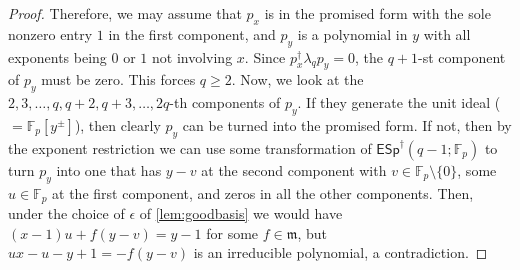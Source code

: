\documentclass[aps,pra,
floatfix,notitlepage,
nofootinbib,
longbibliography,11pt]{revtex4-1}
\theoremstyle{definition}
\newcommand{\FF}{{\mathbb{F}}}
\newcommand{\mm}{\mathfrak{m}}
\newcommand{\ESp}{{\mathsf{ESp}^\dagger}}
\begin{document}
\begin{proof}
Therefore, we may assume that $p_x$ is in the promised form 
with the sole nonzero entry $1$ in the first component,
and $p_y$ is a polynomial in $y$ with all exponents being $0$ or $1$ not involving $x$.
Since $p_x^\dagger \lambda_q p_y = 0$, the $q+1$-st component of $p_y$ must be zero.
This forces $q \ge 2$.
Now, we look at the $2,3,\ldots,q,q+2,q+3,\ldots,2q$-th components of $p_y$.
If they generate the unit ideal ($=\FF_p[y^\pm]$),
then clearly $p_y$ can be turned into the promised form.
If not, then by the exponent restriction we can use some transformation of $\ESp(q-1;\FF_p)$
to turn $p_y$ into one that has $y-v$ at the second component with $v \in \FF_p\setminus\{0\}$,
some $u \in \FF_p$ at the first component,
and zeros in all the other components.
Then, under the choice of $\epsilon$ of \cref{lem:goodbasis}
we would have $(x-1)u + f (y-v) = y-1$ for some $f \in \mm$,
but $ux - u - y+1 = -f(y-v)$ is an irreducible polynomial,
a contradiction.
\end{proof}
\end{document}
